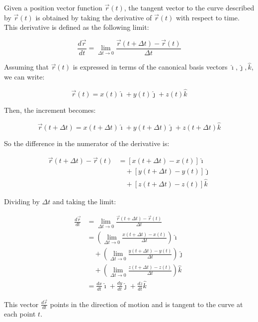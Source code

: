 Given a position vector function \(\vec{r}(t)\), the tangent vector to the curve described by 
\(\vec{r}(t)\) is obtained by taking the derivative of \(\vec{r}(t)\) with respect to time. This 
derivative is defined as the following limit:

\[
    \frac{d\vec{r}}{dt} = \lim_{\Delta t \to 0} \frac{\vec{r}(t + \Delta t) - \vec{r}(t)}{\Delta t}
\]

Assuming that \(\vec{r}(t)\) is expressed in terms of the canonical basis vectors \(\hat{\imath}, 
\hat{\jmath}, \hat{k}\), we can write:

\[
    \vec{r}(t) = x(t)\hat{\imath} + y(t)\hat{\jmath} + z(t)\hat{k}
\]

Then, the increment becomes:

\[
    \vec{r}(t + \Delta t) = x(t + \Delta t)\hat{\imath} + y(t + \Delta t)\hat{\jmath} + z(t + \Delta t)
    \hat{k}
\]

So the difference in the numerator of the derivative is:

\begin{align*}
    \vec{r}(t + \Delta t) - \vec{r}(t) &= \left[x(t + \Delta t) - x(t)\right]\hat{\imath} \\
    &\quad + \left[y(t + \Delta t) - y(t)\right]\hat{\jmath} \\
    &\quad + \left[z(t + \Delta t) - z(t)\right]\hat{k}
\end{align*}

Dividing by \(\Delta t\) and taking the limit:

\begin{align*}
    \frac{d\vec{r}}{dt} &= \lim_{\Delta t \to 0} \frac{\vec{r}(t + \Delta t) - \vec{r}(t)}{\Delta t} \\
    &= \left( \lim_{\Delta t \to 0} \frac{x(t + \Delta t) - x(t)}{\Delta t} \right) \hat{\imath} \\
    &\quad + \left( \lim_{\Delta t \to 0} \frac{y(t + \Delta t) - y(t)}{\Delta t} \right) \hat{\jmath} \\
    &\quad + \left( \lim_{\Delta t \to 0} \frac{z(t + \Delta t) - z(t)}{\Delta t} \right) \hat{k} \\
    &= \frac{dx}{dt} \hat{\imath} + \frac{dy}{dt} \hat{\jmath} + \frac{dz}{dt} \hat{k}
\end{align*}

This vector \(\frac{d\vec{r}}{dt}\) points in the direction of motion and is tangent to the curve at 
each point \(t\).


